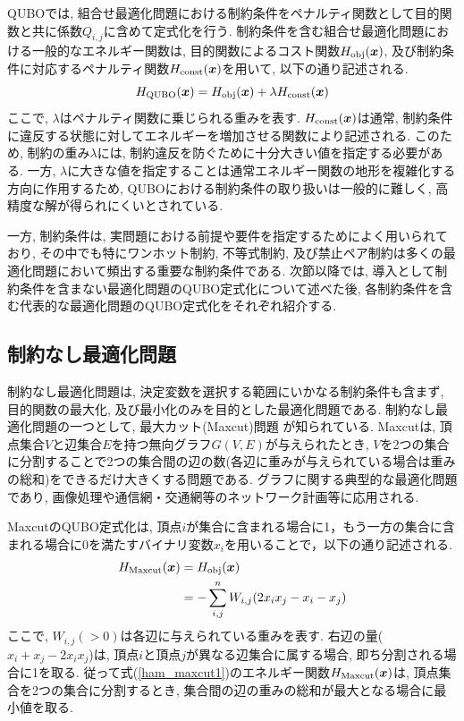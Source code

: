 \documentclass[submit,techrep,noauthor]{ipsj}
\begin{document}
QUBOでは, 組合せ最適化問題における制約条件をペナルティ関数として目的関数と共に係数$Q_{i,j}$に含めて定式化を行う. 制約条件を含む組合せ最適化問題における一般的なエネルギー関数は, 目的関数によるコスト関数$H_{\rm{obj}}(\bm{x})$, 及び制約条件に対応するペナルティ関数$H_{\rm{const}}(\bm{x})$を用いて, 以下の通り記述される.
\begin{equation}
H_{\rm{QUBO}}(\bm{x}) = H_{\rm{obj}}(\bm{x}) + \lambda H_{\rm{const}}(\bm{x})
\label{H_qubo}
\end{equation}
ここで, $\lambda$はペナルティ関数に乗じられる重みを表す. $H_{\rm{const}}(\bm{x})$は通常, 制約条件に違反する状態に対してエネルギーを増加させる関数により記述される. このため, 制約の重み$\lambda$には, 制約違反を防ぐために十分大きい値を指定する必要がある. 一方, $\lambda$に大きな値を指定することは通常エネルギー関数の地形を複雑化する方向に作用するため, QUBOにおける制約条件の取り扱いは一般的に難しく, 高精度な解が得られにくいとされている\cite{kumagai, komatsu, kumagai2}. 

一方, 制約条件は, 実問題における前提や要件を指定するためによく用いられており, その中でも特にワンホット制約, 不等式制約, 及び禁止ペア制約は多くの最適化問題において頻出する重要な制約条件である. 次節以降では, 導入として制約条件を含まない最適化問題のQUBO定式化について述べた後, 各制約条件を含む代表的な最適化問題のQUBO定式化をそれぞれ紹介する.

\subsection{制約なし最適化問題}

制約なし最適化問題は, 決定変数を選択する範囲にいかなる制約条件も含まず, 目的関数の最大化, 及び最小化のみを目的とした最適化問題である. 制約なし最適化問題の一つとして, 最大カット(Maxcut)問題 が知られている. Maxcutは, 頂点集合$V$と辺集合$E$を持つ無向グラフ$G(V,E)$が与えられたとき, $V$を2つの集合に分割することで2つの集合間の辺の数(各辺に重みが与えられている場合は重みの総和)をできるだけ大きくする問題である\cite{maxcut}. グラフに関する典型的な最適化問題であり, 画像処理や通信網・交通網等のネットワーク計画等に応用される.

MaxcutのQUBO定式化は, 頂点$i$が集合に含まれる場合に1，もう一方の集合に含まれる場合に0を満たすバイナリ変数$x_{i}$を用いることで，以下の通り記述される. 
\begin{align}
H_{\rm{Maxcut}}(\bm{x}) &= H_{\rm{obj}}(\bm{x})\nonumber\\
&= -\sum_{i,j}^{n}W_{i,j}(2x_{i}x_{j}-x_{i}-x_{j})
\label{ham_maxcut1}
\end{align}
ここで, $W_{i,j}(>0)$は各辺に与えられている重みを表す. 右辺の量($x_{i}+x_{j}-2x_{i}x_{j}$)は, 頂点$i$と頂点$j$が異なる辺集合に属する場合, 即ち分割される場合に1を取る. 従って式(\ref{ham_maxcut1})のエネルギー関数$H_{\rm{Maxcut}}(\bm{x})$は, 頂点集合を2つの集合に分割するとき, 集合間の辺の重みの総和が最大となる場合に最小値を取る.
\end{document}
